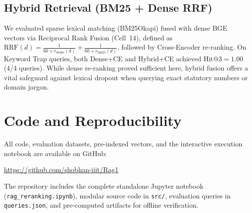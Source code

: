 \documentclass[11pt,a4paper]{article}
\begin{document}
\subsection{Hybrid Retrieval (BM25 + Dense RRF)}

We evaluated sparse lexical matching (BM25Okapi) fused with dense BGE vectors via Reciprocal Rank Fusion (Cell~14), defined as $\text{RRF}(d) = \frac{1}{60 + r_{\text{dense}}(d)} + \frac{1}{60 + r_{\text{bm25}}(d)}$, followed by Cross-Encoder re-ranking. On Keyword Trap queries, both Dense+CE and Hybrid+CE achieved $\text{Hit@3} = 1.00$ (4/4 queries). While dense re-ranking proved sufficient here, hybrid fusion offers a vital safeguard against lexical dropout when querying exact statutory numbers or domain jargon.

\section*{Code and Reproducibility}

All code, evaluation datasets, pre-indexed vectors, and the interactive execution notebook are available on GitHub:
\begin{center}
    \url{https://github.com/shobhan-iiit/Rag1}
\end{center}
The repository includes the complete standalone Jupyter notebook (\texttt{rag\_reranking.ipynb}), modular source code in \texttt{src/}, evaluation queries in \texttt{queries.json}, and pre-computed artifacts for offline verification.
\end{document}
